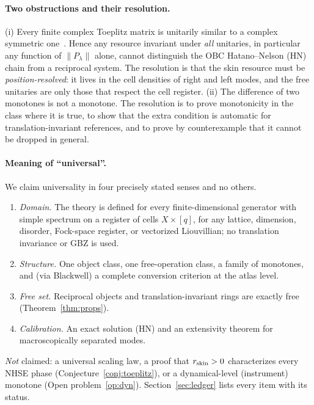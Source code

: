 \documentclass[11pt]{article}
\newcommand{\rskin}{r_{\rm skin}}
\begin{document}
\paragraph*{Two obstructions and their resolution.}
(i) Every finite complex Toeplitz matrix is unitarily similar to a complex symmetric one~\cite{Chien}. Hence any resource
invariant under \emph{all} unitaries, in particular any function of $\|P_\lambda\|$ alone, cannot distinguish the OBC Hatano--Nelson (HN) chain from
a reciprocal system. The resolution is that the skin resource must be \emph{position-resolved}: it lives in the
cell densities of right and left modes, and the free unitaries are only those that respect the cell register.
(ii) The difference of two monotones is not a monotone. The resolution is to prove monotonicity in the class where it is true,
to show that the extra condition is automatic for translation-invariant references, and to prove by counterexample that it cannot be dropped in general.

\paragraph*{Meaning of ``universal''.}
We claim universality in four precisely stated senses and no others.
\begin{enumerate}
\item[\textbf{U1}] \emph{Domain.} The theory is defined for every finite-dimensional generator with simple spectrum on a register of cells $X\times[q]$, for any lattice, dimension, disorder, Fock-space register, or vectorized Liouvillian; no translation invariance or GBZ is used.
\item[\textbf{U2}] \emph{Structure.} One object class, one free-operation class, a family of monotones, and (via Blackwell) a complete conversion criterion at the atlas level.
\item[\textbf{U3}] \emph{Free set.} Reciprocal objects and translation-invariant rings are exactly free (Theorem~\ref{thm:props}).
\item[\textbf{U4}] \emph{Calibration.} An exact solution (HN) and an extensivity theorem for macroscopically separated modes.
\end{enumerate}
\emph{Not} claimed: a universal scaling law, a proof that $\rskin>0$ characterizes every NHSE phase (Conjecture~\ref{conj:toeplitz}), or a dynamical-level (instrument) monotone (Open problem~\ref{op:dyn}). Section~\ref{sec:ledger} lists every item with its status.

\end{document}
